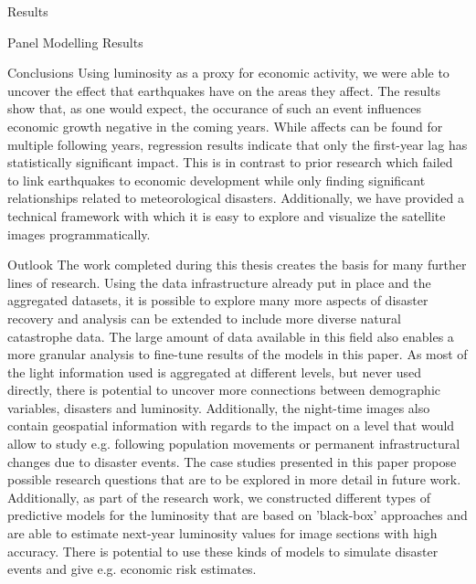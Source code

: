 \documentclass[12pt,fleqn,leqno,letterpaper]{article}
\begin{document}
\begin{section}{Results}
\begin{subsection}{Panel Modelling Results}
  \end{subsection}
  \begin{subsection}{Conclusions}
    Using luminosity as a proxy for economic activity, we were able to uncover the effect that earthquakes have on the areas they affect. The results show that, as one would expect, the occurance of such an event influences economic growth negative in the coming years. While affects can be found for multiple following years, regression results indicate that only the first-year lag has statistically significant impact. This is in contrast to prior research which failed to link earthquakes to economic development while only finding significant relationships related to meteorological disasters. Additionally, we have provided a technical framework with which it is easy to explore and visualize the satellite images programmatically.
  \end{subsection}
  \begin{subsection}{Outlook}
		The work completed during this thesis creates the basis for many further lines of research. Using the data infrastructure already put in place and the aggregated datasets, it is possible to explore many more aspects of disaster recovery and analysis can be extended to include more diverse natural catastrophe data. The large amount of data available in this field also enables a more granular analysis to fine-tune results of the models in this paper. As most of the light information used is aggregated at different levels, but never used directly, there is potential to uncover more connections between demographic variables, disasters and luminosity. Additionally, the night-time images also contain geospatial information with regards to the impact on a level that would allow to study e.g. following population movements or permanent infrastructural changes due to disaster events. The case studies presented in this paper propose possible research questions that are to be explored in more detail in future work. Additionally, as part of the research work, we constructed different types of predictive models for the luminosity that are based on 'black-box' approaches and are able to estimate next-year luminosity values for image sections with high accuracy. There is potential to use these kinds of models to simulate disaster events and give e.g. economic risk estimates.
  \end{subsection}
\end{section}
\end{document}
